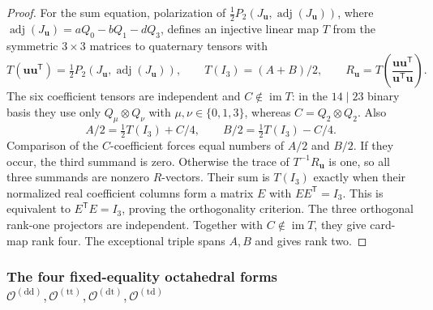 \documentclass[11pt,letterpaper,onecolumn]{article}
\theoremstyle{plain}
\theoremstyle{definition}
\theoremstyle{remark}
\newcommand{\OctDD}{{\mathcal O^{(\mathrm{dd})}}}
\newcommand{\OctTT}{{\mathcal O^{(\mathrm{tt})}}}
\newcommand{\OctDT}{{\mathcal O^{(\mathrm{dt})}}}
\newcommand{\OctTD}{{\mathcal O^{(\mathrm{td})}}}
\begin{document}
\begin{proof}
For the sum equation, polarization of
\(\tfrac12P_2(J_{\mathbf{u}},\operatorname{adj}(J_{\mathbf{u}}))\), where
\(\operatorname{adj}(J_{\mathbf{u}})=aQ_0-bQ_1-dQ_3\), defines an injective linear map
\(T\) from the symmetric \(3\times3\) matrices to quaternary tensors with
\[
 T({\mathbf{u}}{\mathbf{u}}^{\mathsf T})=\tfrac12P_2(J_{\mathbf{u}},\operatorname{adj}(J_{\mathbf{u}})),\qquad
 T(I_3)=(A+B)/2,\qquad
 R_{\mathbf{u}}=T\!\left(\frac{{\mathbf{u}}{\mathbf{u}}^{\mathsf T}}{{\mathbf{u}}^{\mathsf T}{\mathbf{u}}}\right).
\]
The six coefficient tensors are independent and \(C\notin\operatorname{im}T\):
in the \(14\mid23\) binary basis they use only
\(Q_\mu\otimes Q_\nu\) with \(\mu,\nu\in\{0,1,3\}\), whereas
\(C=Q_2\otimes Q_2\).  Also
\[
 A/2=\tfrac12T(I_3)+C/4,\qquad
 B/2=\tfrac12T(I_3)-C/4.
\]
Comparison of the \(C\)-coefficient forces equal numbers of \(A/2\)
and \(B/2\). If they occur, the third summand is zero.  Otherwise the
trace of \(T^{-1}R_{\mathbf{u}}\) is one, so all three summands are nonzero
\(R\)-vectors.  Their sum is \(T(I_3)\) exactly when their normalized
real coefficient columns form a matrix \(E\) with
\(EE^{\mathsf T}=I_3\).  This is equivalent to
\(E^{\mathsf T}E=I_3\), proving the orthogonality criterion.
The three orthogonal rank-one projectors are independent. Together with
\(C\notin\operatorname{im}T\), they give card-map rank four.
The exceptional triple spans \(A,B\) and gives rank two.
\end{proof}

\subsubsection{The four fixed-equality octahedral forms
  \texorpdfstring{\(\OctDD,\OctTT,\OctDT,\OctTD\)}%
  {O (dd), O (tt), O (dt), and O (td)}}
\label{proofsubsec:cert-S4}
\end{document}
